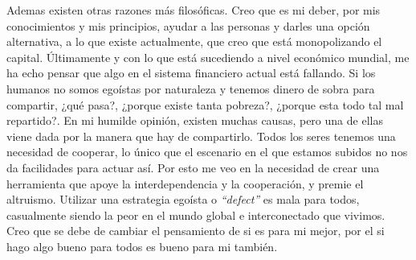 \documentclass[a4paper, 12pt]{book}
\begin{document}
Ademas existen otras razones más filosóficas. Creo que es mi deber, por mis 
conocimientos y mis principios, ayudar a las personas y darles una opción 
alternativa, a lo que existe actualmente, que creo que está monopolizando el 
capital. Últimamente y con lo que está sucediendo a nivel económico mundial, me 
ha echo pensar que algo en el sistema financiero actual está fallando. Si los 
humanos no somos egoístas por naturaleza y tenemos dinero de sobra para 
compartir, ¿qué pasa?, ¿porque existe tanta pobreza?, ¿porque esta todo tal mal 
repartido?. En mi humilde opinión, existen muchas causas, pero una de ellas 
viene dada por la manera que hay de compartirlo. Todos los seres tenemos una 
necesidad de cooperar, \cite{Martin Novak} lo único que el escenario en el que 
estamos subidos no nos da facilidades para actuar así. Por esto me veo en la 
necesidad de crear una herramienta que apoye la interdependencia y la 
cooperación, y premie el altruismo. Utilizar una estrategia egoísta o 
\textit{``defect''} es mala para todos, casualmente siendo la peor en el mundo 
global e interconectado que vivimos. Creo que se debe de cambiar el pensamiento 
de si es para mi mejor, por el si hago algo bueno para todos es bueno para mi 
también.
\end{document}
